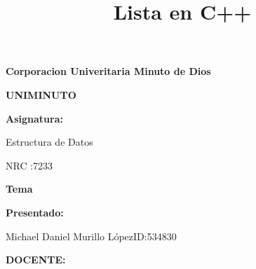 \documentclass[a4paper,12pt]{article}
\title{Lista en C++}
\date{}
\begin{document}
\sloppy

\noindent \begin{Center}
{\fontsize{14pt}{14pt}\selectfont \textbf{Corporacion Univeritaria Minuto de Dios}}
\end{Center}\par


\noindent \begin{Center}
{\fontsize{14pt}{14pt}\selectfont \textbf{UNIMINUTO}}
\end{Center}\par


\noindent \begin{Center}
{\fontsize{14pt}{14pt}\selectfont \textbf{Asignatura:}}
\end{Center}\par


\noindent \begin{Center}
{\fontsize{14pt}{14pt}\selectfont Estructura de Datos}
\end{Center}\par


\noindent \begin{Center}
{\fontsize{14pt}{14pt}\selectfont NRC :7233}
\end{Center}\par


\noindent \begin{Center}
{\fontsize{14pt}{14pt}\selectfont \textbf{Tema}}
\end{Center}\par

\maketitle
\par


\noindent \begin{Center}
{\fontsize{14pt}{14pt}\selectfont \textbf{Presentado:}}
\end{Center}\par


\noindent \begin{Center}
{\fontsize{14pt}{14pt}\selectfont Michael Daniel Murillo LópezID:534830}
\end{Center}\par


\noindent \begin{Center}
{\fontsize{14pt}{14pt}\selectfont \textbf{DOCENTE: }}
\end{Center}\par
\end{document}
